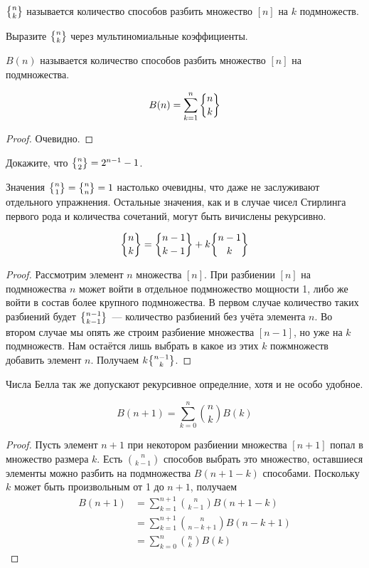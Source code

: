 \begin{definition}
 $\sstirling{n}{k}$ называется количество способов разбить множество $[n]$ на $k$ подмножеств.
\end{definition}

\begin{exercise}
Выразите $\sstirling{n}{k}$ через мультиномиальные коэффициенты.
\end{exercise}

\begin{definition}
 $B(n)$ называется количество способов разбить множество $[n]$ на подмножества.
\end{definition}

\begin{thm}
$$B(n) = \sum_{k=1}^n\sstirling{n}{k}$$
\end{thm}
\begin{proof}
Очевидно.
\end{proof}

\begin{exercise}
Докажите, что $\sstirling{n}{2} = 2^{n-1} - 1$.
\end{exercise}

Значения $\sstirling{n}{1} = \sstirling{n}{n} = 1$ настолько очевидны, что даже не заслуживают отдельного упражнения. Остальные значения, как и в случае чисел Стирлинга первого рода и количества сочетаний, могут быть вичислены рекурсивно.

\begin{thm}
$$\sstirling{n}{k} = \sstirling{n-1}{k-1} + k\sstirling{n-1}{k}$$
\end{thm}
\begin{proof}
Рассмотрим элемент $n$ множества $[n]$. При разбиении $[n]$ на подмножества $n$ может войти в отдельное подмножество мощности 1, либо же войти в состав более крупного подмножества. В первом случае количество таких разбиений будет $\sstirling{n-1}{k-1}$~--- количество разбиений без учёта элемента $n$. Во втором случае мы опять же строим разбиение множества $[n-1]$, но уже на $k$ подмножеств. Нам остаётся лишь выбрать в какое из этих $k$ пожмножеств добавить элемент $n$. Получаем $k\sstirling{n-1}{k}$.
\end{proof}

Числа Белла так же допускают рекурсивное определние, хотя и не особо удобное.

\begin{thm}
$$B(n+1) = \sum_{k=0}^n{n \choose k} B(k)$$
\end{thm}
\begin{proof}
Пусть элемент $n+1$ при некотором разбиении множества $[n+1]$ попал в множество размера $k$. Есть $n\choose k - 1$ способов выбрать это множество, оставшиеся элементы можно разбить на подмножества $B(n+1-k)$ способами. Поскольку $k$ может быть произвольным от 1 до $n+1$, получаем
\begin{align*}
B(n+1) & = \sum_{k=1}^{n+1}{n\choose k-1}B(n+1-k)\\
& = \sum_{k=1}^{n+1}{n\choose n-k+1}B(n-k+1) \\
& = \sum_{k=0}^{n}{n\choose k}B(k)
\end{align*}
\end{proof}

